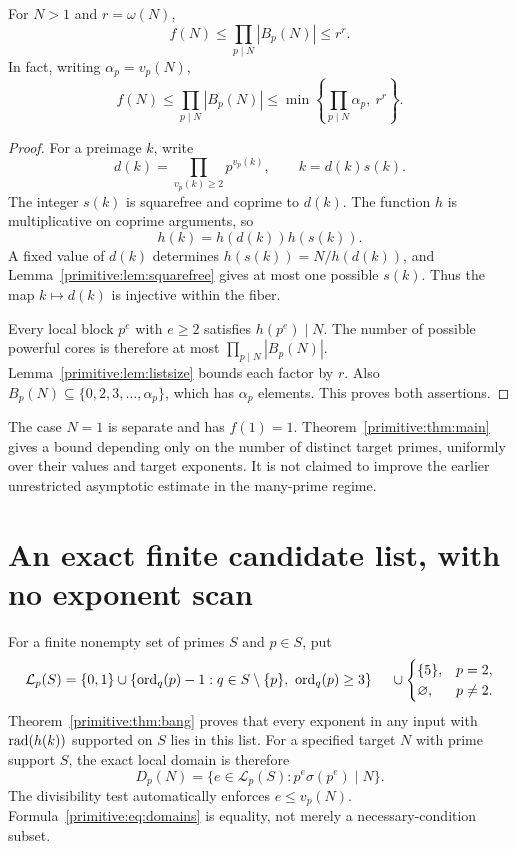 \begin{theorem}\label{primitive:thm:main}
For $N>1$ and $r=\omega(N)$,
\begin{equation}\label{primitive:eq:main}
 \boxed{f(N)\le\prod_{p\mid N}|B_p(N)|\le r^r.}
\end{equation}
In fact, writing $\alpha_p=v_p(N)$,
\[
 f(N)\le\prod_{p\mid N}|B_p(N)|
 \le\min\!\left\{\prod_{p\mid N}\alpha_p,\ r^r\right\}.
\]
\end{theorem}
\begin{proof}
For a preimage $k$, write
\[
 d(k)=\prod_{v_p(k)\ge2}p^{v_p(k)},\qquad k=d(k)s(k).
\]
The integer $s(k)$ is squarefree and coprime to $d(k)$. The function $h$ is multiplicative on coprime arguments, so
\[
 h(k)=h(d(k))h(s(k)).
\]
A fixed value of $d(k)$ determines $h(s(k))=N/h(d(k))$, and Lemma~\ref{primitive:lem:squarefree} gives at most one possible $s(k)$. Thus the map $k\mapsto d(k)$ is injective within the fiber.

Every local block $p^e$ with $e\ge2$ satisfies $h(p^e)\mid N$. The number of possible powerful cores is therefore at most $\prod_{p\mid N}|B_p(N)|$. Lemma~\ref{primitive:lem:listsize} bounds each factor by $r$. Also $B_p(N)\subseteq\{0,2,3,\ldots,\alpha_p\}$, which has $\alpha_p$ elements. This proves both assertions.
\end{proof}

The case $N=1$ is separate and has $f(1)=1$. Theorem~\ref{primitive:thm:main} gives a bound depending only on the number of distinct target primes, uniformly over their values and target exponents. It is not claimed to improve the earlier unrestricted asymptotic estimate in the many-prime regime.


\section{An exact finite candidate list, with no exponent scan}
For a finite nonempty set of primes $S$ and $p\in S$, put
\begin{align*}
 \mathcal L_p(S)={}&\{0,1\}\cup
 \{\operatorname{ord}_q(p)-1:q\in S\setminus\{p\},\ \operatorname{ord}_q(p)\ge3\}\
 &{}\cup\begin{cases}\{5\},&p=2,\\\varnothing,&p\ne2.\end{cases}
\end{align*}
Theorem~\ref{primitive:thm:bang} proves that every exponent in any input with $\operatorname{rad}(h(k))$ supported on $S$ lies in this list. For a specified target $N$ with prime support $S$, the exact local domain is therefore
\begin{equation}\label{primitive:eq:domains}
 \boxed{D_p(N)=\{e\in\mathcal L_p(S):p^e\sigma(p^e)\mid N\}.}
\end{equation}
The divisibility test automatically enforces $e\le v_p(N)$. Formula~\eqref{primitive:eq:domains} is equality, not merely a necessary-condition subset.

